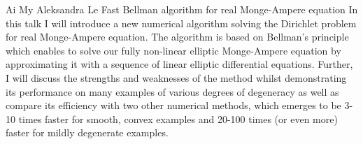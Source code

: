 \talk
{%
    Ai My Aleksandra Le
}
{%
    Fast Bellman algorithm for real Monge-Ampere equation
}
{%
    In this talk I will introduce a new numerical algorithm solving
    the Dirichlet problem for real Monge-Ampere equation. The
    algorithm is based on Bellman's principle which enables to
    solve our fully non-linear elliptic Monge-Ampere equation by
    approximating it with a sequence of linear elliptic differential
    equations. Further, I will discuss the strengths and weaknesses
    of the method whilst demonstrating its performance on many
    examples of various degrees of degeneracy as well as compare its
    efficiency with two other numerical methods, which emerges to be
    3-10 times faster for smooth, convex examples and 20-100 times
    (or even more) faster for mildly degenerate examples.
}
